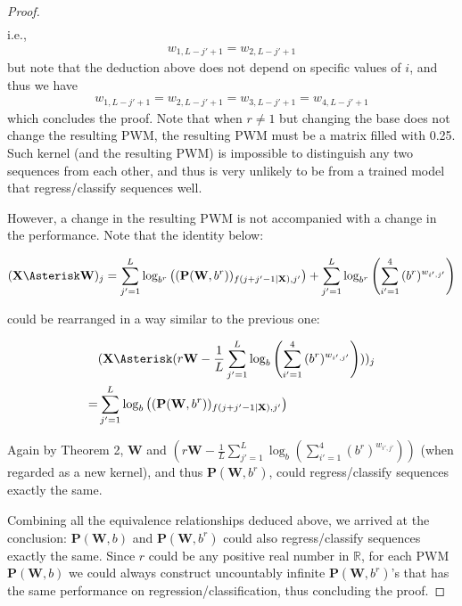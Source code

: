 \documentclass[12pt]{article}
\newcommand{\matrixSymbol}[1]{\mathbf{#1}}
\begin{document}
\begin{proof}
\begin{align}
\end{align}
i.e., 
\begin{align}
w_{1, L-j'+1} = w_{2, L-j'+1}
\end{align}
but note that the deduction above does not depend on specific values of $i$, and thus we have
\begin{align}
w_{1, L-j'+1} = w_{2, L-j'+1} = w_{3, L-j'+1} = w_{4, L-j'+1}
\end{align}
which concludes the proof. Note that when $r \neq 1$ but changing the base does not change the resulting PWM, the resulting PWM must be a matrix filled with 0.25. Such kernel (and the resulting PWM) is impossible to distinguish any two sequences from each other, and thus is very unlikely to be from a trained model that regress/classify sequences well.

However, a change in the resulting PWM is not accompanied with a change in the performance. Note that the identity below:

\begin{align}
(\matrixSymbol{X} \Asterisk \matrixSymbol{W})_j =  \sum_{j'=1}^{L}{ \log_{b^{r}}\left( (\matrixSymbol{P}(\matrixSymbol{W}, b^{r} ))_{f(j + j' - 1|\matrixSymbol{X}), j'} \right) } + \sum_{j'=1}^{L}{\log_{b^{r}} \left( \sum_{i'=1}^{4}{(b^{r})^{w_{i', j'}} }\right) } 
\end{align}

could be rearranged in a way similar to the previous one:

\begin{align}
  & (\matrixSymbol{X} \Asterisk (r\matrixSymbol{W} -\frac{1}{L}\sum_{j'=1}^{L}{\log_{b} \left( \sum_{i'=1}^{4}{(b^{r})^{w_{i', j'}} }\right) }  ) )_j \notag \\
= & \sum_{j'=1}^{L}{ \log_{b}\left( (\matrixSymbol{P}(\matrixSymbol{W}, b^{r} ))_{f(j + j' - 1|\matrixSymbol{X}), j'} \right) } 
\end{align}

Again by Theorem 2, $\matrixSymbol{W}$ and $(r\matrixSymbol{W} -\frac{1}{L}\sum_{j'=1}^{L}{\log_{b} \left( \sum_{i'=1}^{4}{(b^{r})^{w_{i', j'}} }\right) }  )$ (when regarded as a new kernel), and thus $\matrixSymbol{P}(\matrixSymbol{W}, b^{r} )$, could regress/classify sequences exactly the same.

Combining all the equivalence relationships deduced above, we arrived at the conclusion: $\matrixSymbol{P}(\matrixSymbol{W}, b)$ and $\matrixSymbol{P}(\matrixSymbol{W}, b^{r} )$ could also regress/classify sequences exactly the same. Since $r$ could be any positive real number in $\mathbb{R}$, for each PWM $\matrixSymbol{P}(\matrixSymbol{W}, b)$ we could always construct uncountably infinite $\matrixSymbol{P}(\matrixSymbol{W}, b^{r} )$'s that has the same performance on regression/classification, thus concluding the proof.
\end{proof}
\end{document}
